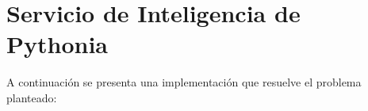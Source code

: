 \section{Servicio de Inteligencia de Pythonia}

A continuación se presenta una implementación que resuelve el problema planteado:
  

